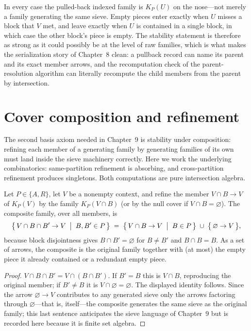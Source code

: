 \begin{remark}\label{ch07:rem-pullback-summary}
In every case the pulled-back indexed family is $K_{P}(U)$ on the nose---not merely a family generating the same sieve. Empty pieces enter exactly when $U$ misses a block that $V$ met, and leave exactly when $U$ is contained in a single block, in which case the other block's piece is empty. The stability statement is therefore as strong as it could possibly be at the level of raw families, which is what makes the serialization story of Chapter~8 clean: a pullback record can name its parent and its exact member arrows, and the recomputation check of the parent-resolution algorithm can literally recompute the child members from the parent by intersection.
\end{remark}

\section{Cover composition and refinement}\label{ch07:sec-composition}

The second basis axiom needed in Chapter~9 is stability under composition: refining each member of a generating family by generating families of its own must land inside the sieve machinery correctly. Here we work the underlying combinatorics: same-partition refinement is absorbing, and cross-partition refinement produces singletons. Both computations are pure intersection algebra.

\begin{lemma}\label{ch07:lem-same-refinement}
Let $P\in\{A,R\}$, let $V$ be a nonempty context, and refine the member $V\cap B\to V$ of $K_{P}(V)$ by the family $K_{P}(V\cap B)$ (or by the null cover if $V\cap B=\varnothing$). The composite family, over all members, is
\[
\bigl\{\,V\cap B\cap B'\to V \;\bigm|\; B,B'\in P\,\bigr\}
\;=\;
\bigl\{\,V\cap B\to V \;\bigm|\; B\in P\,\bigr\}\;\cup\;\bigl\{\,\varnothing\to V\,\bigr\},
\]
because block disjointness gives $B\cap B'=\varnothing$ for $B\neq B'$ and $B\cap B=B$. As a set of arrows, the composite is the original family together with (at most) the empty piece it already contained or a redundant empty piece.
\end{lemma}

\begin{proof}
$V\cap B\cap B'=V\cap(B\cap B')$. If $B'=B$ this is $V\cap B$, reproducing the original member; if $B'\neq B$ it is $V\cap\varnothing=\varnothing$. The displayed identity follows. Since the arrow $\varnothing\to V$ contributes to any generated sieve only the arrows factoring through $\varnothing$---that is, itself---the composite generates the same sieve as the original family; this last sentence anticipates the sieve language of Chapter~9 but is recorded here because it is finite set algebra.
\end{proof}

